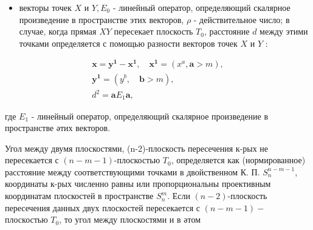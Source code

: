 \documentclass[10pt]{article}
\begin{document}
\begin{itemize}

  \item векторы точек $X$ и $Y, E_{0}$ - линейный оператор, определяющий скалярное произведение в пространстве этих векторов, $\rho$ - действительное число; в случае, когда прямая $X Y$ пересекает плоскость $T_{0}$, расстояние $d$ между этими точками определяется с помощью разности векторов точек $X$ и $Y$ :

\end{itemize}



\[

\begin{gathered}

\boldsymbol{x}=\boldsymbol{y}^{\mathbf{1}}-\boldsymbol{x}^{\mathbf{1}}, \quad \boldsymbol{x}^{\mathbf{1}}=\left(x^{a}, \boldsymbol{a}>m\right), \\

\boldsymbol{y}^{\mathbf{1}}=\left(y^{b}, \quad \boldsymbol{b}>m\right), \\

d^{2}=\boldsymbol{a} E_{1} \boldsymbol{a},

\end{gathered}

\]



где $E_{1}$ - линейный оператор, определяющий скалярное произведение в пространстве әтих векторов.



Угол между двумя плоскостями, (n-2)-плоскость пересечения к-рых не пересекается с $(n-m-1)$-плоскостью $T_{0}$, определяется как (нормированное) расстояние между соответствующими точками в двойственном К. П. $S_{n}^{n-m-1}$, координаты к-рых численно равны или пропорциональны проективным координатам плоскостей в пространстве $S_{n}^{m}$. Если $(n-2)$-плоскость пересечения данных двух плоскостей пересекается с $(n-m-1)-$ плоскостью $T_{0}$, то угол между плоскостями и в әтом
\end{document}
